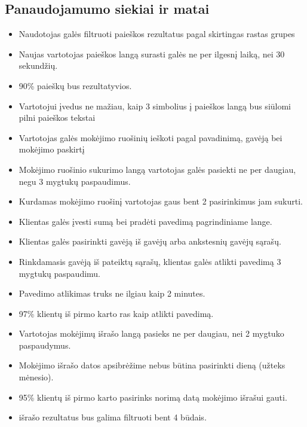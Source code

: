 \documentclass{VUMIFPSkursinis}
\begin{document}
\subsection{Panaudojamumo siekiai ir matai}
\begin{itemize}
	\item Naudotojas galės filtruoti paieškos rezultatus pagal skirtingas rastas grupes
	\item Naujas vartotojas paieškos langą surasti galės ne per ilgesnį laiką, nei 30 sekundžių.
	\item 90\% paieškų bus rezultatyvios.
	\item Vartotojui įvedus ne mažiau, kaip 3 simbolius į paieškos langą bus siūlomi pilni paieškos tekstai
	\item Vartotojas galės mokėjimo ruošinių ieškoti pagal pavadinimą, gavėją bei mokėjimo paskirtį
	\item Mokėjimo ruošinio sukurimo langą vartotojas galės pasiekti ne per daugiau, negu 3 mygtukų paspaudimus.
	\item Kurdamas mokėjimo ruošinį vartotojas gaus bent 2 pasirinkimus jam sukurti.
	\item Klientas galės įvesti sumą bei pradėti pavedimą pagrindiniame lange.
	\item Klientas galės pasirinkti gavėją iš gavėjų arba ankstesnių gavėjų sąrašų.
	\item Rinkdamasis gavėją iš pateiktų sąrašų, klientas galės atlikti pavedimą 3 mygtukų paspaudimu.
	\item Pavedimo atlikimas truks ne ilgiau kaip 2 minutes.
	\item 97\% klientų iš pirmo karto ras kaip atlikti pavedimą.
	\item Vartotojas mokėjimų išrašo langą pasieks ne per daugiau, nei 2 mygtuko paspaudymus.
	\item Mokėjimo išrašo datos apsibrėžime nebus būtina pasirinkti dieną (užteks mėnesio).
	\item 95\% klientų iš pirmo karto pasirinks norimą datą mokėjimo išrašui gauti.
	\item išrašo rezultatus bus galima filtruoti bent 4 būdais.
\end{itemize}
\pagebreak
\end{document}

